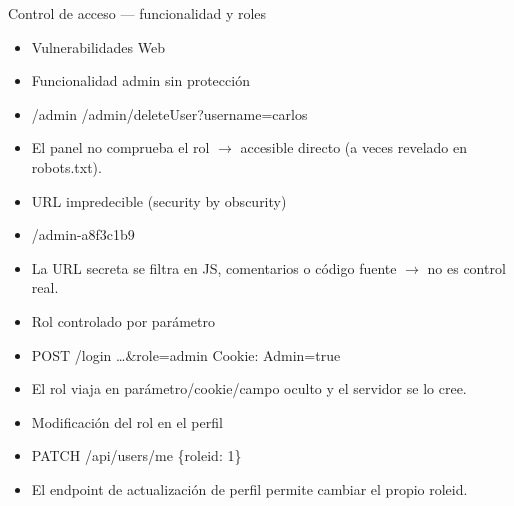 \documentclass[aspectratio=169,10pt]{beamer}
\begin{document}
\begin{frame}[allowframebreaks]{Control de acceso --- funcionalidad y roles}
\small
  \begin{itemize}
  \item Vulnerabilidades Web
  \item Funcionalidad admin sin protección
  \item /admin /admin/deleteUser?username=carlos
  \item El panel no comprueba el rol $\rightarrow$ accesible directo (a veces revelado en robots.txt).
  \item URL impredecible (security by obscurity)
  \item /admin-a8f3c1b9
  \item La URL secreta se filtra en JS, comentarios o código fuente $\rightarrow$ no es control real.
  \item Rol controlado por parámetro
  \item POST /login \dots{}\&role=admin Cookie: Admin=true
  \item El rol viaja en parámetro/cookie/campo oculto y el servidor se lo cree.
  \item Modificación del rol en el perfil
  \item PATCH /api/users/me \{\textquotedbl{}roleid\textquotedbl{}: 1\}
  \item El endpoint de actualización de perfil permite cambiar el propio roleid.
  \end{itemize}
\end{frame}
\end{document}
